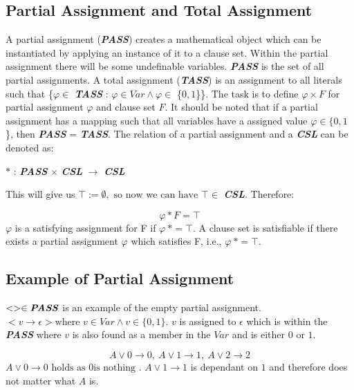 \documentclass[11pt,a4paper]{report}
\begin{document}
\subsection {Partial Assignment and Total Assignment}
\label{sec:pata}

A partial assignment (\textbf{\textit{PASS}}) creates a mathematical object which can be instantiated by applying an instance of it to a clause set. Within the partial assignment there will be some undefinable variables. \textbf{\textit{PASS}} is the set of all partial assignments. 
A total assignment (\textbf{\textit{TASS}}) is an assignment to all literals such that \{$\varphi \in$ \textbf{\textit{TASS}} : $\varphi \in Var \land \varphi \in$ \{$0,1$\}\}. The task is to define $\varphi \times F$ for partial assignment $\varphi$ and clause set $F$. It should be noted that if a partial assignment has a mapping such that all variables have a assigned value $\varphi \in \{0,1$\}, then \textbf{\textit{PASS}} = \textbf{\textit{TASS}}. 
The relation of a partial assignment and a \textbf{\textit{CSL}} can be denoted as: 

\begin{center}
$\ast$ : \textbf{\textit{PASS}} $\times$ \textbf{\textit{CSL}} $\rightarrow$ \textbf{\textit{CSL}}
\end{center}
This will give us $\top:= \emptyset, \text{ so now we can have } \top \in$ \textbf{\textit{CSL}}. Therefore:

\begin{displaymath}
\varphi \ast F = \top
\end{displaymath}
$\varphi$ is a satisfying assignment for F if $\varphi \: \ast = \top$. A clause set is satisfiable if there exists a partial assignment $\varphi$ which satisfies F, i.e., $\varphi \: \ast = \top$. 

\subsection{Example of Partial Assignment}
$<> \in \textbf{\textit{PASS}}$ is an example of the empty partial assignment.
$< v \rightarrow \epsilon > \text{where } v \in Var \land v \in \{0,1\}$. $v$ is assigned to $\epsilon$ which is within the \textbf{\textit{PASS}} where $v$ is also found as a member in the $Var$ and is either $0$ or $1$. 

\begin{displaymath}
A \lor 0 \rightarrow 0, \: A \lor 1 \rightarrow 1, \: A \lor 2 \rightarrow 2
\end{displaymath}
$A \lor 0 \rightarrow 0 \text{ holds as }0 \text {is nothing }$. $A \lor 1 \rightarrow 1$ is dependant on $1$ and therefore does not matter what $A$ is.
\end{document}
